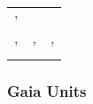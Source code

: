 \documentclass[]{article}
\theoremstyle{plain}
\theoremstyle{remark}
\theoremstyle{definition}
\begin{document}
\begin{longtable}[]{@{}lll@{}}
\begin{minipage}[t]{0.11\columnwidth}
'\strut
\end{minipage}\tabularnewline
\begin{minipage}[t]{0.41\columnwidth}\raggedright
'\strut
\end{minipage} & \begin{minipage}[t]{0.28\columnwidth}\raggedright
'\strut
\end{minipage} & \begin{minipage}[t]{0.11\columnwidth}\raggedright
'\strut
\end{minipage}\tabularnewline
\bottomrule
\end{longtable}

\hypertarget{gaia-units}{%
\subsubsection{Gaia Units}\label{gaia-units}}
\end{document}
